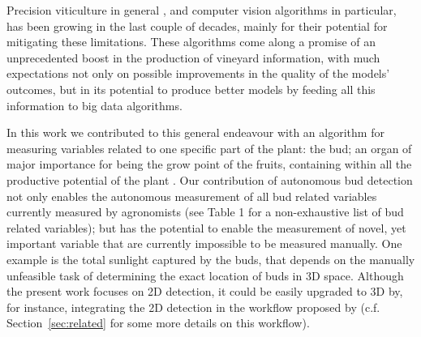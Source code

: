 \documentclass[a4paper,authoryear,review]{elsarticle}
\begin{document}
%
Precision viticulture in general \citep{bramley2004understanding, matese2015technology, ozdemir2017precision}, and computer vision algorithms \cite{seng2018computer} in particular, has been growing in the last couple of decades, mainly for their potential for mitigating these limitations. These algorithms come along a promise of an unprecedented boost in the production of vineyard information, with much expectations not only on possible improvements in the quality of the models’ outcomes, but   in its potential to produce better models by feeding all this information to big data algorithms. 

%
In this work we contributed to this general endeavour with an algorithm for measuring variables related to one specific part of the plant: the bud; an organ of major importance for being the  grow point of the fruits, containing within all the productive potential of the plant \citep{may2000bud, vasconcelos2009flowering, keller2020science}. Our contribution of  autonomous bud detection not only enables the autonomous measurement of all bud related variables currently measured by agronomists (see Table 1 for a non-exhaustive list of bud related variables); but has the potential to enable the measurement of novel, yet important variable  that are currently impossible to be measured manually. One example is the total sunlight captured by the buds, that depends on the manually unfeasible task of determining the exact location of buds in 3D space.  Although the present work focuses on 2D detection, it could be easily upgraded to 3D by, for instance, integrating the 2D detection in the workflow proposed by \cite{diaz2018grapevine} (c.f. Section~\ref{sec:related} for some more details on this workflow).
\end{document}

